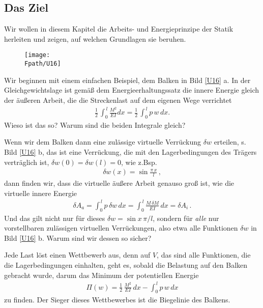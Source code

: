 {\textcolor{blau2}{\section{Das Ziel}}
Wir wollen in diesem Kapitel die Arbeits- und Energieprinzipe der Statik herleiten und zeigen, auf welchen Grundlagen sie beruhen.

\begin{figure}[tbp]
\texttt{[image: \\Fpath/U16]}
\end{figure}%

Wir beginnen mit einem einfachen Beispiel, dem Balken in Bild \ref{U16} a. In der Gleichgewichtslage ist gem\"{a}{\ss} dem Energieerhaltungssatz die innere Energie gleich der \"{a}u{\ss}eren Arbeit, die die Streckenlast auf dem eigenen Wege verrichtet
\begin{align}
\frac{1}{2}\,\int_0^{\,l} \frac{M^2}{EI}dx = \frac{1}{2}\,\int_0^{\,l} p\,w\,dx.
\end{align}
Wieso ist das so? Warum sind die beiden Integrale gleich?

Wenn wir dem Balken dann eine zul\"{a}ssige virtuelle Verr\"{u}ckung $\delta w $ erteilen, s. Bild \ref{U16} b, das ist eine Verr\"{u}ckung, die mit den Lagerbedingungen des Tr\"{a}gers vertr\"{a}glich ist,  $\delta w(0) = \delta w(l) = 0$, wie z.Bsp.
\begin{align}
\delta w(x) = \sin \frac{\pi\,x}{l}\,,
\end{align}
dann finden wir, dass die virtuelle \"{a}u{\ss}ere Arbeit genauso gro{\ss} ist, wie die virtuelle innere Energie
\begin{align}
\delta A_a = \int_0^{\,l} p\,\delta w\,dx = \int_0^{\,l} \frac{M\,\delta M}{EI}\,dx = \delta A_i\,.
\end{align}
Und das gilt nicht nur f\"{u}r dieses $\delta w = \sin x\,\pi/l$, sondern f\"{u}r {\em alle\/} nur vorstellbaren zul\"{a}ssigen virtuellen Verr\"{u}ckungen, also etwa alle Funktionen $\delta w$ in Bild \ref{U16} b. Warum sind wir dessen so sicher?

Jede Last l\"{o}st einen Wettbewerb aus, denn auf $V$, das sind alle Funktionen, die die Lagerbedingungen einhalten, geht es, sobald die Belastung auf den Balken gebracht wurde, darum das Minimum der potentiellen Energie
\begin{align}
\Pi(w) = \frac{1}{2}\,\frac{M^2}{EI}\,dx - \int_0^{\,l} p\,w\,dx
\end{align}
zu finden. Der Sieger dieses Wettbewerbes ist die Biegelinie des Balkens.

}
